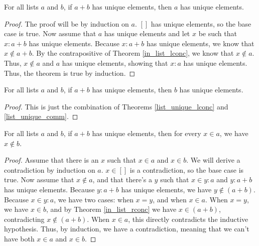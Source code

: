 \documentclass[../../math.tex]{subfiles}
\begin{document}
\begin{theorem} \label{list_unique_lconc}
    For all lists $a$ and $b$, if $a + b$ has unique elements, then $a$ has
    unique elements.
\end{theorem}
\begin{proof}
    The proof will be by induction on $a$.  $[]$ has unique elements, so the
    base case is true.  Now assume that $a$ has unique elements and let $x$ be
    such that $x : a + b$ has unique elements.  Because $x : a + b$ has unique
    elements, we know that $x \notin a + b$.  By the contrapositive of Theorem
    \ref{in_list_lconc}, we know that $x \notin a$.  Thus, $x \notin a$ and $a$
    has unique elements, showing that $x : a$ has unique elements.  Thus, the
    theorem is true by induction.
\end{proof}

\begin{theorem} \label{list_unique_rconc}
    For all lists $a$ and $b$, if $a + b$ has unique elements, then $b$ has
    unique elements.
\end{theorem}
\begin{proof}
    This is just the combination of Theorems \ref{list_unique_lconc} and
    \ref{list_unique_comm}.
\end{proof}

\begin{theorem} \label{list_unique_conc}
    For all lists $a$ and $b$, if $a + b$ has unique elements, then for every $x
    \in a$, we have $x \notin b$.
\end{theorem}
\begin{proof}
    Assume that there is an $x$ such that $x \in a$ and $x \in b$.  We will
    derive a contradiction by induction on $a$.  $x \in []$ is a contradiction,
    so the base case is true.  Now assume that $x \notin a$, and that there's a
    $y$ such that $x \in y : a$ and $y : a + b$ has unique elements.  Because $y
    : a + b$ has unique elements, we have $y \notin (a + b)$.  Because $x \in y
    : a$, we have two cases: when $x = y$, and when $x \in a$.  When $x = y$, we
    have $x \in b$, and by Theorem \ref{in_list_rconc} we have $x \in (a + b)$,
    contradicting $x \notin (a + b)$.  When $x \in a$, this directly
    contradicts the inductive hypothesis.  Thus, by induction, we have a
    contradiction, meaning that we can't have both $x \in a$ and $x \in b$.
\end{proof}
\end{document}
